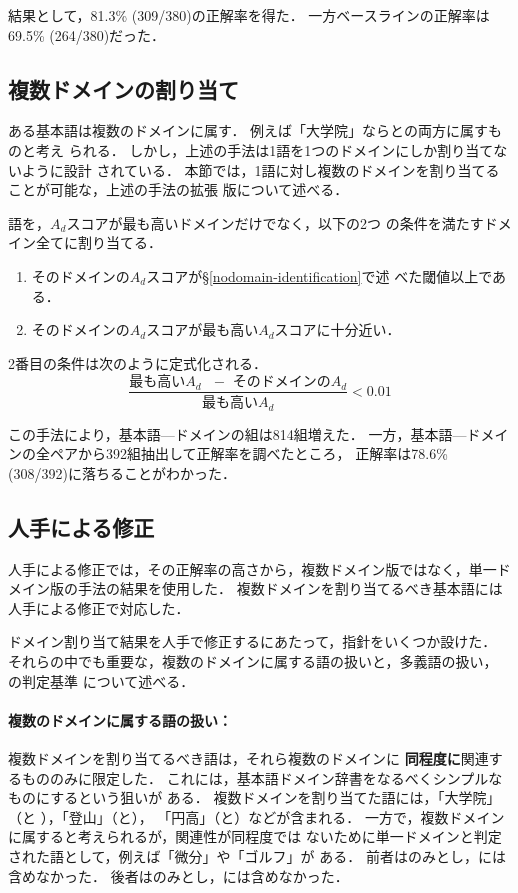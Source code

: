 \documentclass[japanese]{jnlp_1.4}
\newcommand{\dom}[1]{}
\begin{document}
結果として，81.3\% (309/380)の正解率を得た．
一方ベースラインの正解率は69.5\% (264/380)だった．


\subsection{複数ドメインの割り当て}

ある基本語は複数のドメインに属す．
例えば「大学院」なら\dom{教育・学習}と\dom{科学・技術}の両方に属すものと考え
られる．
しかし，上述の手法は1語を1つのドメインにしか割り当てないように設計
されている．
本節では，1語に対し複数のドメインを割り当てることが可能な，上述の手法の拡張
版について述べる．

語を，$A_d$スコアが最も高いドメインだけでなく，以下の2つ
の条件を満たすドメイン全てに割り当てる．

\begin{enumerate}
 \item そのドメインの$A_d$スコアが\S\ref{nodomain-identification}で述
べた閾値以上である．
 \item そのドメインの$A_d$スコアが最も高い$A_d$スコアに十分近い．
\end{enumerate}

2番目の条件は次のように定式化される．
$$\frac{\textrm{最も高い$A_d$ $-$ そのドメインの$A_d$}}
{\textrm{最も高い$A_d$}} < 0.01$$

この手法により，基本語—ドメインの組は814組増えた．
一方，基本語—ドメインの全ペアから392組抽出して正解率を調べたところ，
正解率は78.6\% (308/392)に落ちることがわかった．


\subsection{人手による修正 \label{manual-correction}}

人手による修正では，その正解率の高さから，複数ドメイン版ではなく，単一ド
メイン版の手法の結果を使用した．
複数ドメインを割り当てるべき基本語には人手による修正で対応した．

ドメイン割り当て結果を人手で修正するにあたって，指針をいくつか設けた．
それらの中でも重要な，複数のドメインに属する語の扱いと，多義語の扱い，
\dom{ドメイン無し}の判定基準
について述べる．


\paragraph{複数のドメインに属する語の扱い：}

複数ドメインを割り当てるべき語は，それら複数のドメインに
\textbf{同程度に}関連するもののみに限定した．
これには，基本語ドメイン辞書をなるべくシンプルなものにするという狙いが
ある．
複数ドメインを割り当てた語には，「大学院」（\dom{教育・学習}と
\dom{科学・技術}），「登山」（\dom{レクリエーション}と\dom{スポーツ}），
「円高」（\dom{ビジネス}と\dom{政治}）などが含まれる．
一方で，複数ドメインに属すると考えられるが，関連性が同程度では
ないために単一ドメインと判定された語として，例えば「微分」や「ゴルフ」が
ある．
前者は\dom{教育・学習}のみとし，\dom{科学・技術}には含めなかった．
後者は\dom{スポーツ}のみとし，\dom{レクリエーション}には含めなかった．
\end{document}
